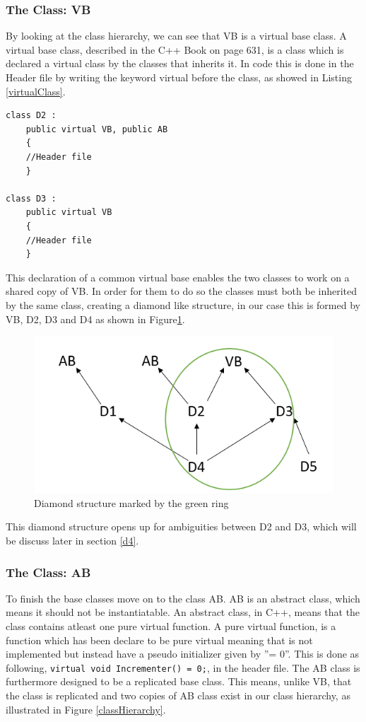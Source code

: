 \subsubsection{The Class: VB}
By looking at the class hierarchy, we can see that VB is a virtual base class. A virtual base class, described in the C++ Book on page 631\cite{CplusplusBook}, is a class which is declared a virtual class by the classes that inherits it.
In code this is done in the Header file by writing the keyword virtual before the class, as showed in Listing \ref{virtualClass}.
\begin{lstlisting}[caption=Declaring a class virtual, label=virtualClass]
class D2 :
	public virtual VB, public AB
	{
	//Header file 
	}
	
class D3 :
	public virtual VB
	{
	//Header file 
	}
\end{lstlisting}
This declaration of a common virtual base enables the two classes to work on a shared copy of VB.
In order for them to do so the classes must both be inherited by the same class, creating a diamond like structure, in our case this is formed by VB, D2, D3 and D4 as shown in Figure\ref{diamondStructure}.
\begin{figure}[H]  
\centering
\includegraphics[scale=0.3]{grafik/diamondstructure}
\caption{Diamond structure marked by the green ring}
\label{diamondStructure}
\end{figure}
This diamond structure opens up for ambiguities between D2 and D3, which will be discuss later in section \ref{d4}.

\subsubsection{The Class: AB}
To finish the base classes move on to the class AB. AB is an abstract class, which means it should not be instantiatable. 
An abstract class, in C++, means that the class contains atleast one pure virtual function.
A pure virtual function, is a function which has been declare to be pure virtual meaning that is not implemented but instead have a pseudo initializer given by ''= 0''.
This is done as following, \lstinline$virtual void Incrementer() = 0;$, in the header file.
The AB class is furthermore designed to be a replicated base class. 
This means, unlike VB, that the class is replicated and two copies of AB class exist in our class hierarchy, as illustrated in Figure \ref{classHierarchy}.

